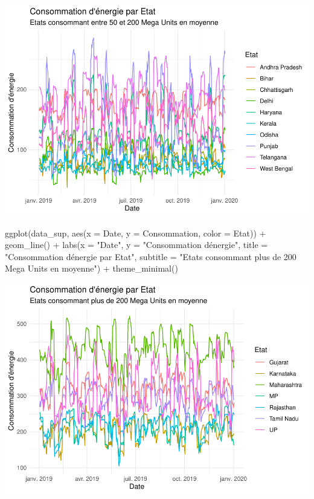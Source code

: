 \documentclass[
]{article}
\newenvironment{Shaded}{\begin{snugshade}}{\end{snugshade}}
\newcommand{\AttributeTok}[1]{\textcolor[rgb]{0.77,0.63,0.00}{#1}}
\newcommand{\FunctionTok}[1]{\textcolor[rgb]{0.00,0.00,0.00}{#1}}
\newcommand{\NormalTok}[1]{#1}
\newcommand{\SpecialCharTok}[1]{\textcolor[rgb]{0.00,0.00,0.00}{#1}}
\newcommand{\StringTok}[1]{\textcolor[rgb]{0.31,0.60,0.02}{#1}}
\begin{document}
\includegraphics{Projet_CHESNAIS_GUIBERT_files/figure-latex/unnamed-chunk-12-2.pdf}

\begin{Shaded}
\begin{Highlighting}[]
\FunctionTok{ggplot}\NormalTok{(data\_sup, }\FunctionTok{aes}\NormalTok{(}\AttributeTok{x =}\NormalTok{ Date, }\AttributeTok{y =}\NormalTok{ Consommation, }\AttributeTok{color =}\NormalTok{ Etat)) }\SpecialCharTok{+}
  \FunctionTok{geom\_line}\NormalTok{() }\SpecialCharTok{+}
  \FunctionTok{labs}\NormalTok{(}\AttributeTok{x =} \StringTok{"Date"}\NormalTok{, }\AttributeTok{y =} \StringTok{"Consommation d\textquotesingle{}énergie"}\NormalTok{,}
       \AttributeTok{title =} \StringTok{"Consommation d\textquotesingle{}énergie par Etat"}\NormalTok{, }
       \AttributeTok{subtitle =} \StringTok{"Etats consommant plus de 200 Mega Units en moyenne"}\NormalTok{) }\SpecialCharTok{+}
  \FunctionTok{theme\_minimal}\NormalTok{()}
\end{Highlighting}
\end{Shaded}

\includegraphics{Projet_CHESNAIS_GUIBERT_files/figure-latex/unnamed-chunk-12-3.pdf}
\end{document}

